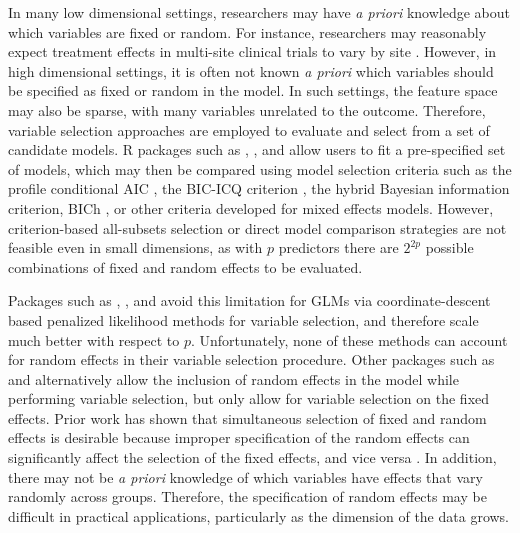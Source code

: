 In many low dimensional settings, researchers may have \textit{a priori} knowledge about which variables are fixed or random. For instance, researchers may reasonably expect treatment effects in multi-site clinical trials to vary by site \citep{feaster2011modeling}. However, in high dimensional settings, it is often not known \textit{a priori} which variables should be specified as fixed or random in the model. In such settings, the feature space may also be sparse, with many variables unrelated to the outcome.  Therefore, variable selection approaches are employed to evaluate and select from a set of candidate models.   R packages such as  \citep{lme42007},  \citep{mcemglm2015}, and  \citep{mcmcglmm2010} allow users to fit a pre-specified set of models, which may then be compared using model selection criteria such as the profile conditional AIC \citep{donohue2011conditional}, the BIC-ICQ criterion \citep{BICq2011}, the hybrid Bayesian information criterion, BICh \citep{BICh2014}, or other criteria developed for mixed effects models. However, criterion-based all-subsets selection or direct model comparison strategies are not feasible even in small dimensions, as with $p$ predictors there are $2^{2p}$ possible combinations of fixed and random effects to be evaluated. 

Packages such as  \citep{glmnet2010},  \citep{ncvreg2011}, and  \citep{grpreg2015} avoid this limitation for GLMs via coordinate-descent based penalized likelihood methods for variable selection, and therefore scale much better with respect to $p$.  Unfortunately, none of these methods can account for random effects in their variable selection procedure. Other packages such as  \citep{glmmLassoManual} and  \citep{schelldorfer2014glmmLASSO} alternatively allow the inclusion of random effects in the model while performing variable selection, but only allow for variable selection on the fixed effects. Prior work has shown that simultaneous selection of fixed and random effects is desirable because improper specification of the random effects can significantly affect the selection of the fixed effects, and vice versa \citep{bondell2010joint}. In addition, there may not be \textit{a priori} knowledge of which variables have effects that vary randomly across groups.
Therefore, the specification of random effects may be difficult in practical applications, particularly as the dimension of the data grows.

